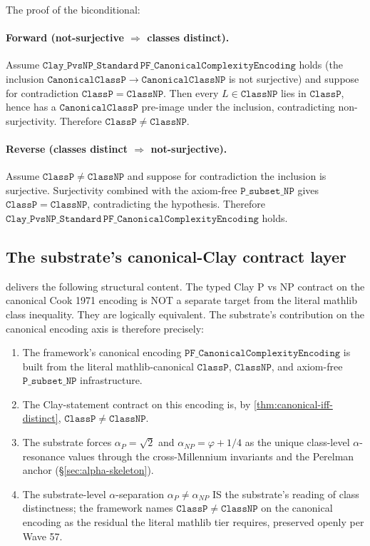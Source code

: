 \documentclass[11pt,a4paper]{article}
\theoremstyle{plain}
\theoremstyle{definition}
\begin{document}
\noindent The proof of the biconditional:

\paragraph{Forward (not-surjective $\Rightarrow$ classes distinct).}
Assume $\mathtt{Clay\_PvsNP\_Standard}\,
\mathtt{PF\_CanonicalComplexityEncoding}$ holds (the inclusion
$\mathtt{CanonicalClassP} \to \mathtt{CanonicalClassNP}$ is not
surjective) and suppose for contradiction $\mathtt{ClassP} =
\mathtt{ClassNP}$. Then every $L \in \mathtt{ClassNP}$ lies in
$\mathtt{ClassP}$, hence has a $\mathtt{CanonicalClassP}$ pre-image
under the inclusion, contradicting non-surjectivity. Therefore
$\mathtt{ClassP} \neq \mathtt{ClassNP}$.

\paragraph{Reverse (classes distinct $\Rightarrow$ not-surjective).}
Assume $\mathtt{ClassP} \neq \mathtt{ClassNP}$ and suppose for
contradiction the inclusion is surjective. Surjectivity combined with
the axiom-free $\mathtt{P\_subset\_NP}$ gives
$\mathtt{ClassP} = \mathtt{ClassNP}$, contradicting the hypothesis.
Therefore $\mathtt{Clay\_PvsNP\_Standard}\,
\mathtt{PF\_CanonicalComplexityEncoding}$ holds.

\subsection{The substrate's canonical-Clay contract layer}
\label{sec:contract-layer}

 delivers the following structural
content. The typed Clay P vs NP contract on the canonical Cook 1971
encoding is NOT a separate target from the literal mathlib class
inequality. They are logically equivalent. The substrate's contribution
on the canonical encoding axis is therefore precisely:

\begin{enumerate}[label=(\textbf{C\arabic*}),leftmargin=*]
\item The framework's canonical encoding
  $\mathtt{PF\_CanonicalComplexityEncoding}$ is built from the literal
  mathlib-canonical $\mathtt{ClassP}$, $\mathtt{ClassNP}$, and
  axiom-free $\mathtt{P\_subset\_NP}$ infrastructure.
\item The Clay-statement contract on this encoding is, by
  \cref{thm:canonical-iff-distinct}, $\mathtt{ClassP} \neq
  \mathtt{ClassNP}$.
\item The substrate forces $\alpha_{P} = \sqrt{2}$ and $\alpha_{NP} =
  \varphi + 1/4$ as the unique class-level $\alpha$-resonance values
  through the cross-Millennium invariants and the Perelman anchor
  (\S\ref{sec:alpha-skeleton}).
\item The substrate-level $\alpha$-separation
  $\alpha_{P} \neq \alpha_{NP}$ IS the substrate's reading of class
  distinctness; the framework names $\mathtt{ClassP} \neq
  \mathtt{ClassNP}$ on the canonical encoding as the residual the
  literal mathlib tier requires, preserved openly per Wave 57.
\end{enumerate}
\end{document}
